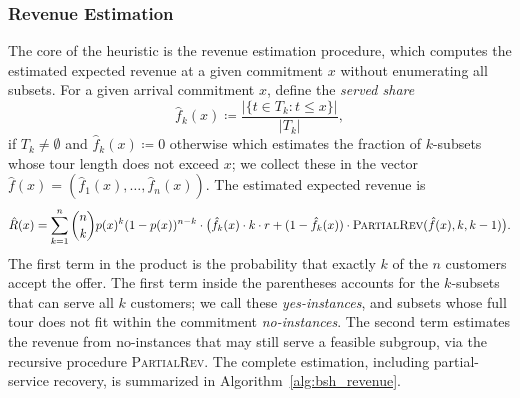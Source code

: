 \documentclass[11pt]{article}
\theoremstyle{plain}
\theoremstyle{definition}
\begin{document}
	\subsubsection{Revenue Estimation}\label{sec:revenue_estimation}
	
	The core of the heuristic is the revenue estimation procedure, which computes the estimated expected revenue at a given commitment $x$ without enumerating all subsets.
	For a given arrival commitment $x$, define the \emph{served share}
	\[
	\hat{f}_k(x) \coloneqq \frac{|\{t \in T_k : t \leq x\}|}{|T_k|},
	\]
	if \(T_k \neq \emptyset\) and \(\hat{f}_k(x) \coloneqq 0\) otherwise
	which estimates the fraction of $k$-subsets whose tour length does not exceed $x$; we collect these in the vector $\hat{f}(x) = (\hat{f}_1(x), \ldots, \hat{f}_n(x))$.
	The estimated expected revenue is
	\begin{equation}\label{eq:bsh_revenue}
		\hat{R}(x) = \sum_{k=1}^{n} \binom{n}{k} p(x)^k (1-p(x))^{n-k} \cdot \bigl(
		\hat{f}_k(x) \cdot k \cdot r
		+ (1 - \hat{f}_k(x)) \cdot \textsc{PartialRev}(\hat{f}(x), k, k-1)
		\bigr).
	\end{equation}
	The first term in the product is the probability that exactly $k$ of the $n$ customers accept the offer.
	The first term inside the parentheses accounts for the $k$-subsets that can serve all $k$ customers; we call these \emph{yes-instances}, and subsets whose full tour does not fit within the commitment \emph{no-instances}.
	The second term estimates the revenue from no-instances that may still serve a feasible subgroup, via the recursive procedure \textsc{PartialRev}.
	The complete estimation, including partial-service recovery, is summarized in Algorithm~\ref{alg:bsh_revenue}.
	
\end{document}
